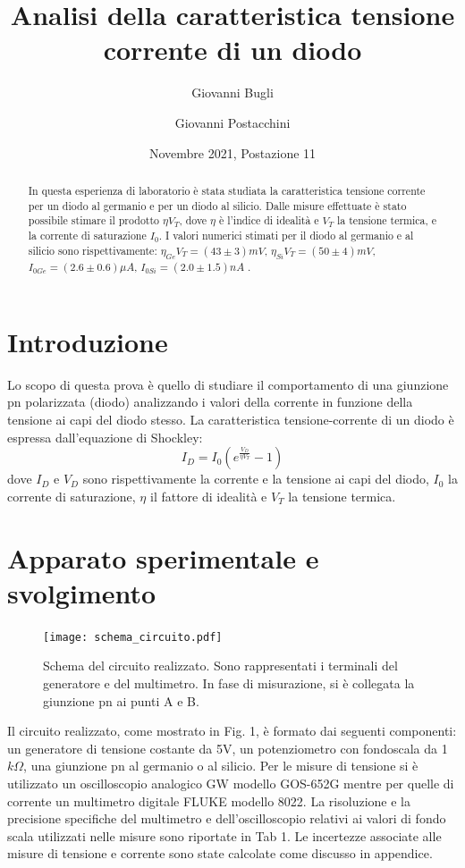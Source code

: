 \documentclass[a4paper,11pt]{article}
\begin{document}
\title{Analisi della caratteristica tensione corrente di un diodo}
\author{Giovanni Bugli \and Giovanni Postacchini}
\date{Novembre 2021, Postazione 11}

\maketitle
\begin{abstract}
  In questa esperienza di laboratorio è stata studiata la caratteristica tensione corrente per un diodo al germanio e per un diodo al silicio. Dalle misure effettuate è stato possibile stimare il prodotto $\eta V_T$, dove $\eta$ è  l'indice di idealità e $V_T$ la tensione termica,  e la corrente di saturazione $I_0$. I valori numerici stimati per il diodo al germanio e al silicio sono  rispettivamente: $\eta_{Ge} V_T = (43\pm 3) mV$, $\eta_{Si} V_T= (50\pm 4) mV$, $I_{0 Ge} = (2.6\pm 0.6) \mu A$, $I_{0 Si} = (2.0\pm 1.5) nA$ .
\end{abstract}
\section{Introduzione}
Lo scopo di questa prova è quello di studiare il comportamento di una giunzione pn polarizzata (diodo) analizzando i valori della corrente in funzione della tensione ai capi del diodo stesso. La caratteristica tensione-corrente di un diodo è espressa dall'equazione di Shockley:
\begin{equation}
  I_D = I_0 (e^{\frac{V_D}{\eta V_T}}-1)
\end{equation}
dove $I_D$ e $V_D$ sono rispettivamente la corrente e la tensione ai capi del diodo, $I_0$ la corrente di saturazione, $\eta$ il fattore di idealità e $V_T$ la tensione termica.

\section{Apparato sperimentale e svolgimento}
\begin{figure}[h!]
  \centering
  \texttt{[image: schema\_circuito.pdf]}
  \caption{Schema del circuito realizzato. Sono rappresentati i terminali del generatore e del multimetro. In fase di misurazione, si è collegata la giunzione pn ai punti A e B.}
\end{figure}
Il circuito realizzato, come mostrato in Fig. 1, è formato dai seguenti componenti: un generatore di tensione costante da 5V, un potenziometro con fondoscala da 1$k\Omega$, una giunzione pn al germanio o al silicio. Per le misure di tensione si è utilizzato un oscilloscopio analogico GW modello GOS-652G mentre per quelle di corrente un multimetro digitale FLUKE modello 8022.
\newline
La risoluzione e la precisione specifiche del multimetro e dell'oscilloscopio relativi ai valori di fondo scala utilizzati nelle misure sono riportate in Tab 1. Le incertezze associate alle misure di tensione e corrente sono state calcolate come discusso in appendice.
\end{document}
